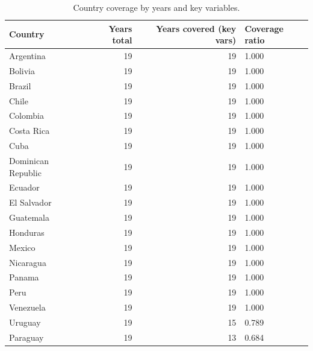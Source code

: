 \begin{table}

\caption{Country coverage by years and key variables.}
\centering
\begin{tabular}[t]{lrrl}
\toprule
Country & Years total & Years covered (key vars) & Coverage ratio\\
\midrule
Argentina & 19 & 19 & 1.000\\
Bolivia & 19 & 19 & 1.000\\
Brazil & 19 & 19 & 1.000\\
Chile & 19 & 19 & 1.000\\
Colombia & 19 & 19 & 1.000\\
\addlinespace
Costa Rica & 19 & 19 & 1.000\\
Cuba & 19 & 19 & 1.000\\
Dominican Republic & 19 & 19 & 1.000\\
Ecuador & 19 & 19 & 1.000\\
El Salvador & 19 & 19 & 1.000\\
\addlinespace
Guatemala & 19 & 19 & 1.000\\
Honduras & 19 & 19 & 1.000\\
Mexico & 19 & 19 & 1.000\\
Nicaragua & 19 & 19 & 1.000\\
Panama & 19 & 19 & 1.000\\
\addlinespace
Peru & 19 & 19 & 1.000\\
Venezuela & 19 & 19 & 1.000\\
Uruguay & 19 & 15 & 0.789\\
Paraguay & 19 & 13 & 0.684\\
\bottomrule
\end{tabular}
\end{table}
